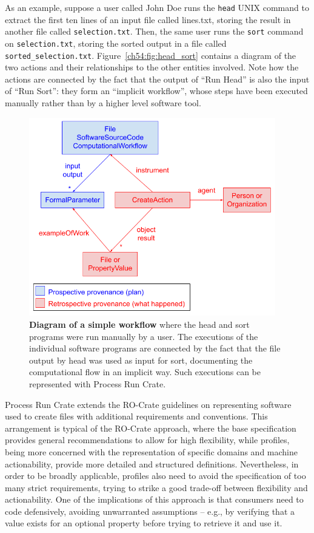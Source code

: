 As an example,
suppose a user called John Doe runs the \texttt{head} UNIX command to extract the first ten lines of an input file called lines.txt, storing the result in another file called \texttt{selection.txt}.
Then, the same user runs the \texttt{sort}
command on \texttt{selection.txt}, storing the sorted output in a file called \texttt{sorted\_selection.txt}.
Figure~\vref{ch54:fig:head_sort} contains a diagram of the two actions and their relationships to the other entities involved.
Note how the actions are connected by the fact that the output of ``Run Head'' is also the input of ``Run Sort'': they form an ``implicit workflow'', whose steps have been executed manually rather than by a higher level software tool.

\begin{figure}[!ht]
\includegraphics[width=29em]{figures/ch54/image2.png}
\caption{{\bf Diagram of a simple workflow} where the head and sort programs were run manually by a user.
The executions of the individual software programs are connected by the fact that the file output by head was used as input for sort, documenting the computational flow in an implicit way.
Such executions can be represented with Process Run Crate.}
\label{ch54:fig:head_sort}
\end{figure}


Process Run Crate extends the RO-Crate guidelines on representing software used to create files with additional requirements and conventions.
This arrangement is typical of the RO-Crate approach, where the base specification provides general recommendations to allow for high flexibility, while profiles, being more concerned with the representation of specific domains and machine actionability, provide more detailed and structured definitions.
Nevertheless, in order to be broadly applicable, profiles also need to avoid the specification of too many strict requirements, trying to strike a good trade-off between flexibility and actionability.
One of the implications of this approach is that consumers need to code defensively, avoiding unwarranted assumptions – e.g., by verifying that a value exists for an optional property before trying to retrieve it and use it.


